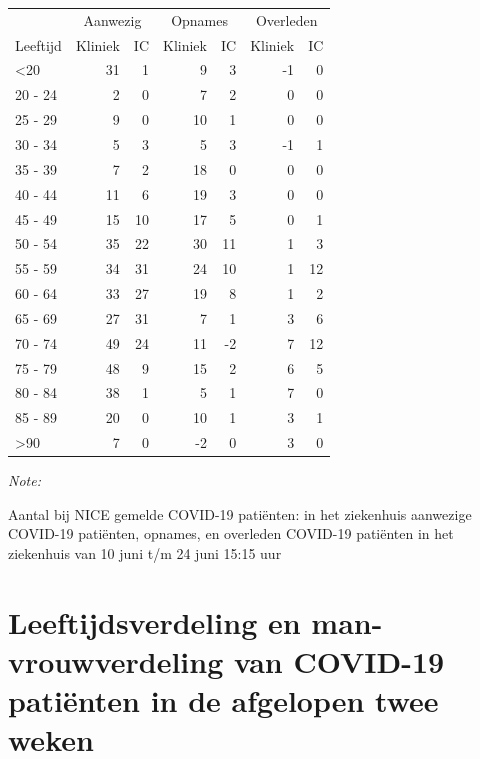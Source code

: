 \documentclass[
  english,
  man,floatsintext]{apa6}
\begin{document}
\begin{table}
\centering\begingroup\fontsize{10}{12}\selectfont

\begin{threeparttable}
\begin{tabular}{lrrrrrr}
\toprule
\multicolumn{1}{c}{ } & \multicolumn{2}{c}{Aanwezig} & \multicolumn{2}{c}{Opnames} & \multicolumn{2}{c}{Overleden} \\
\cmidrule(l{3pt}r{3pt}){2-3} \cmidrule(l{3pt}r{3pt}){4-5} \cmidrule(l{3pt}r{3pt}){6-7}
Leeftijd & Kliniek & IC & Kliniek & IC & Kliniek & IC\\
\midrule
<20 & 31 & 1 & 9 & 3 & -1 & 0\\
20 - 24 & 2 & 0 & 7 & 2 & 0 & 0\\
25 - 29 & 9 & 0 & 10 & 1 & 0 & 0\\
30 - 34 & 5 & 3 & 5 & 3 & -1 & 1\\
35 - 39 & 7 & 2 & 18 & 0 & 0 & 0\\
40 - 44 & 11 & 6 & 19 & 3 & 0 & 0\\
45 - 49 & 15 & 10 & 17 & 5 & 0 & 1\\
50 - 54 & 35 & 22 & 30 & 11 & 1 & 3\\
55 - 59 & 34 & 31 & 24 & 10 & 1 & 12\\
60 - 64 & 33 & 27 & 19 & 8 & 1 & 2\\
65 - 69 & 27 & 31 & 7 & 1 & 3 & 6\\
70 - 74 & 49 & 24 & 11 & -2 & 7 & 12\\
75 - 79 & 48 & 9 & 15 & 2 & 6 & 5\\
80 - 84 & 38 & 1 & 5 & 1 & 7 & 0\\
85 - 89 & 20 & 0 & 10 & 1 & 3 & 1\\
>90 & 7 & 0 & -2 & 0 & 3 & 0\\
\bottomrule
\end{tabular}
\begin{tablenotes}
\item \textit{Note: } 
\item Aantal bij NICE gemelde COVID-19 patiënten: in het ziekenhuis aanwezige COVID-19 patiënten, opnames, en overleden COVID-19 patiënten in het ziekenhuis van 10 juni t/m 24 juni 15:15 uur
\end{tablenotes}
\end{threeparttable}
\endgroup{}
\end{table}

\newpage

\hypertarget{leeftijdsverdeling-en-man-vrouwverdeling-van-covid-19-patiuxebnten-in-de-afgelopen-twee-weken}{%
\section{Leeftijdsverdeling en man-vrouwverdeling van COVID-19 patiënten in de afgelopen twee weken}\label{leeftijdsverdeling-en-man-vrouwverdeling-van-covid-19-patiuxebnten-in-de-afgelopen-twee-weken}}
\end{document}
